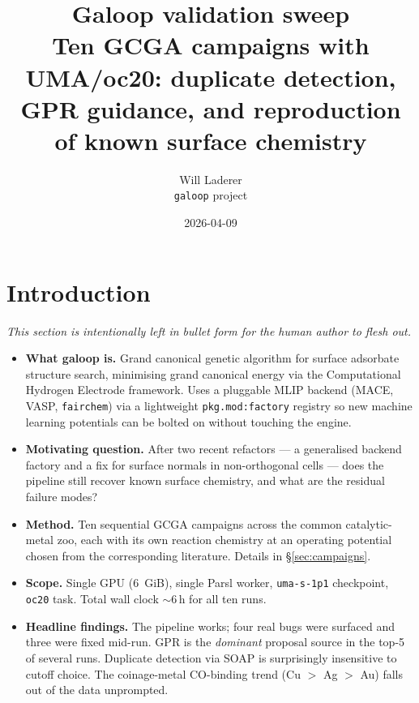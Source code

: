 \documentclass[11pt,a4paper]{article}
\title{Galoop validation sweep \\
  \large Ten GCGA campaigns with UMA/oc20: duplicate detection, GPR guidance,
  and reproduction of known surface chemistry}
\author{Will Laderer \\ \texttt{galoop} project}
\date{2026-04-09}
\begin{document}
\maketitle
\tableofcontents
\vspace{1em}

\section{Introduction}
\label{sec:intro}

\emph{This section is intentionally left in bullet form for the human author
to flesh out.}

\begin{itemize}
  \item \textbf{What galoop is.} Grand canonical genetic algorithm for
    surface adsorbate structure search, minimising grand canonical
    energy via the Computational Hydrogen Electrode framework. Uses
    a pluggable MLIP backend (MACE, VASP, \texttt{fairchem}) via a
    lightweight \texttt{pkg.mod:factory} registry so new machine
    learning potentials can be bolted on without touching the engine.
  \item \textbf{Motivating question.} After two recent refactors --- a
    generalised backend factory and a fix for surface normals in
    non-orthogonal cells --- does the pipeline still recover known
    surface chemistry, and what are the residual failure modes?
  \item \textbf{Method.} Ten sequential GCGA campaigns across the
    common catalytic-metal zoo, each with its own reaction chemistry
    at an operating potential chosen from the corresponding
    literature. Details in \S\ref{sec:campaigns}.
  \item \textbf{Scope.} Single GPU (6~GiB), single Parsl worker,
    \texttt{uma-s-1p1} checkpoint, \texttt{oc20} task. Total wall
    clock $\sim$6\,h for all ten runs.
  \item \textbf{Headline findings.} The pipeline works; four real
    bugs were surfaced and three were fixed mid-run. GPR is the
    \emph{dominant} proposal source in the top-5 of several runs.
    Duplicate detection via SOAP is surprisingly insensitive to
    cutoff choice. The coinage-metal CO-binding trend
    (Cu $>$ Ag $>$ Au) falls out of the data unprompted.
\end{itemize}
\end{document}
